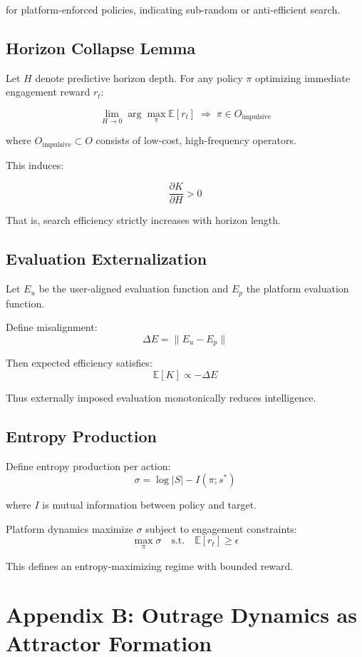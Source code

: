 \documentclass[12pt]{article}
\begin{document}
for platform-enforced policies, indicating sub-random or anti-efficient search.

\subsection{Horizon Collapse Lemma}

Let $H$ denote predictive horizon depth. For any policy $\pi$ optimizing immediate engagement reward $r_t$:

\[
\lim_{H \to 0} \arg\max_{\pi} \mathbb{E}[r_t] \;\Rightarrow\; \pi \in O_{\text{impulsive}}
\]

where $O_{\text{impulsive}} \subset O$ consists of low-cost, high-frequency operators.

This induces:

\[
\frac{\partial K}{\partial H} > 0
\]

That is, search efficiency strictly increases with horizon length.

\subsection{Evaluation Externalization}

Let $E_u$ be the user-aligned evaluation function and $E_p$ the platform evaluation function.

Define misalignment:
\[
\Delta E = \| E_u - E_p \|
\]

Then expected efficiency satisfies:
\[
\mathbb{E}[K] \propto -\Delta E
\]

Thus externally imposed evaluation monotonically reduces intelligence.

\subsection{Entropy Production}

Define entropy production per action:
\[
\sigma = \log |S| - I(\pi; s^*)
\]

where $I$ is mutual information between policy and target.

Platform dynamics maximize $\sigma$ subject to engagement constraints:
\[
\max_{\pi} \sigma \quad \text{s.t.} \quad \mathbb{E}[r_t] \geq \epsilon
\]

This defines an entropy-maximizing regime with bounded reward.

\section{Appendix B: Outrage Dynamics as Attractor Formation}
\end{document}
